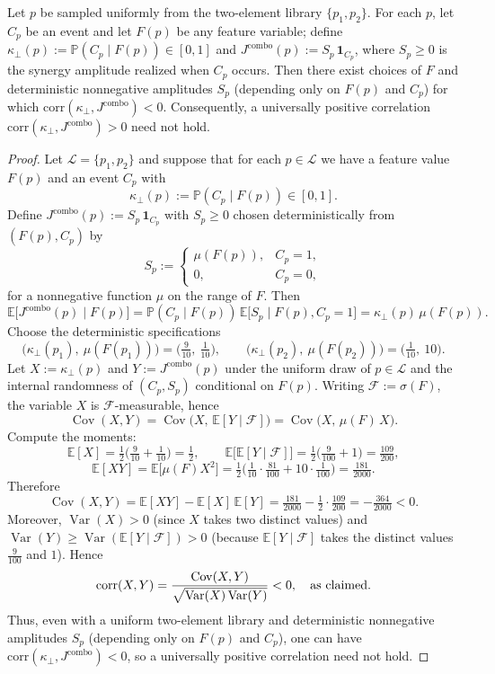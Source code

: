 ﻿\begin{proposition}\label{prop:negative-corr-combo}
Let $p$ be sampled uniformly from the two-element library $\{p_1,p_2\}$. For each $p$, let $C_p$ be an event and let $F(p)$ be any feature variable; define $\kappa_\perp(p):=\mathbb P(C_p\mid F(p))\in[0,1]$ and $J^{\mathrm{combo}}(p):=S_p\,\mathbf 1_{C_p}$, where $S_p\ge 0$ is the synergy amplitude realized when $C_p$ occurs. Then there exist choices of $F$ and deterministic nonnegative amplitudes $S_p$ (depending only on $F(p)$ and $C_p$) for which $\mathrm{corr}(\kappa_\perp, J^{\mathrm{combo}})<0$. Consequently, a universally positive correlation $\mathrm{corr}(\kappa_\perp, J^{\mathrm{combo}})>0$ need not hold.
\end{proposition}

\begin{proof}
Let $\mathcal L=\{p_1,p_2\}$ and suppose that for each $p\in\mathcal L$ we have a feature value $F(p)$ and an event $C_p$ with
\[
\kappa_\perp(p):=\mathbb P(C_p\mid F(p))\in[0,1].
\]
Define $J^{\mathrm{combo}}(p):=S_p\,\mathbf 1_{C_p}$ with $S_p\ge 0$ chosen deterministically from $(F(p),C_p)$ by
\[
S_p:=\begin{cases}\mu(F(p)),& C_p=1,\\ 0,& C_p=0,\end{cases}
\]
for a nonnegative function $\mu$ on the range of $F$. Then
\[
\mathbb E\big[J^{\mathrm{combo}}(p)\mid F(p)\big]=\mathbb P(C_p\mid F(p))\,\mathbb E\big[S_p\mid F(p),C_p{=}1\big]=\kappa_\perp(p)\,\mu(F(p)).
\]
Choose the deterministic specifications
\[
\big(\kappa_\perp(p_1),\ \mu(F(p_1))\big)=\Big(\tfrac{9}{10},\ \tfrac{1}{10}\Big),\qquad \big(\kappa_\perp(p_2),\ \mu(F(p_2))\big)=\Big(\tfrac{1}{10},\ 10\Big).
\]
Let $X:=\kappa_\perp(p)$ and $Y:=J^{\mathrm{combo}}(p)$ under the uniform draw of $p\in\mathcal L$ and the internal randomness of $(C_p,S_p)$ conditional on $F(p)$. Writing $\mathcal F:=\sigma(F)$, the variable $X$ is $\mathcal F$-measurable, hence
\[
\operatorname{Cov}(X,Y)=\operatorname{Cov}\big(X,\,\mathbb E[Y\mid \mathcal F]\big)=\operatorname{Cov}\big(X,\,\mu(F)\,X\big).
\]
Compute the moments:
\[
\mathbb E[X]=\tfrac{1}{2}\Big(\tfrac{9}{10}+\tfrac{1}{10}\Big)=\tfrac{1}{2},\qquad \mathbb E\big[\mathbb E[Y\mid \mathcal F]\big]=\tfrac{1}{2}\Big(\tfrac{9}{100}+1\Big)=\tfrac{109}{200},
\]
\[
\mathbb E[XY]=\mathbb E\big[\mu(F)X^2\big]=\tfrac{1}{2}\Big(\tfrac{1}{10}\cdot\tfrac{81}{100}+10\cdot\tfrac{1}{100}\Big)=\tfrac{181}{2000}.
\]
Therefore
\[
\operatorname{Cov}(X,Y)=\mathbb E[XY]-\mathbb E[X]\,\mathbb E[Y]=\tfrac{181}{2000}-\tfrac{1}{2}\cdot\tfrac{109}{200}=-\tfrac{364}{2000}<0.
\]
Moreover, $\operatorname{Var}(X)>0$ (since $X$ takes two distinct values) and $\operatorname{Var}(Y)\ge \operatorname{Var}(\mathbb E[Y\mid \mathcal F])>0$ (because $\mathbb E[Y\mid \mathcal F]$ takes the distinct values $\tfrac{9}{100}$ and $1$). Hence
\[
\mathrm{corr}(X,Y)=\frac{\operatorname{Cov}(X,Y)}{\sqrt{\operatorname{Var}(X)\operatorname{Var}(Y)}}<0,\quad\text{as claimed.}\qedhere
\]
Thus, even with a uniform two-element library and deterministic nonnegative amplitudes $S_p$ (depending only on $F(p)$ and $C_p$), one can have $\mathrm{corr}(\kappa_\perp, J^{\mathrm{combo}})<0$, so a universally positive correlation need not hold.
\end{proof}
